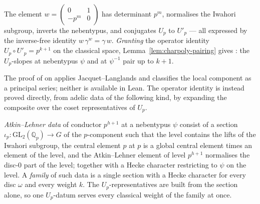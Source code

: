 \begin{proposition}
  \label{prop:atkin-lehner}
  \leanok
  The element $w = \begin{pmatrix}0&1\\-p^{m}&0\end{pmatrix}$ has determinant $p^{m}$, normalises
  the Iwahori subgroup, inverts the nebentypus, and conjugates $U_p$ to $U'_p$ --- all expressed
  by the inverse-free identity $w\,\gamma^{w} = \gamma\,w$.  \emph{Granting} the operator
  identity $U_p\circ U'_p = p^{k+1}$ on the classical space,
  Lemma~\ref{lem:charpoly-pairing} gives \cite[Proposition 3.22]{LWX}: the $U_p$-slopes at
  nebentypus $\psi$ and at $\psi^{-1}$ pair up to $k+1$.
\end{proposition}

The proof of \cite[Proposition 3.22]{LWX} on \cite[p.~24]{LWX} applies Jacquet--Langlands and
classifies the local component as a principal series; neither is available in Lean.  The operator
identity is instead proved directly, from adelic data of the following kind, by expanding the
composite over the coset representatives of $U_p$.

\begin{definition}
  \label{def:al-data}
  \leanok
  \emph{Atkin--Lehner data} of conductor $p^{h+1}$ at a nebentypus $\psi$ consist of a section
  $\iota_p : \mathrm{GL}_2(\mathbb{Q}_p) \to G$ of the $p$-component such that the level contains
  the lifts of the Iwahori subgroup, the central element $p$ at $p$ is a global central element
  times an element of the level, and the Atkin--Lehner element of level $p^{h+1}$ normalises the
  disc-$0$ part of the level; together with a Hecke character restricting to $\psi$ on the level.
  A \emph{family} of such data is a single section with a Hecke character for every disc $\omega$
  and every weight $k$.  The $U_p$-representatives are built from the section alone, so one
  $U_p$-datum serves every classical weight of the family at once.
\end{definition}

